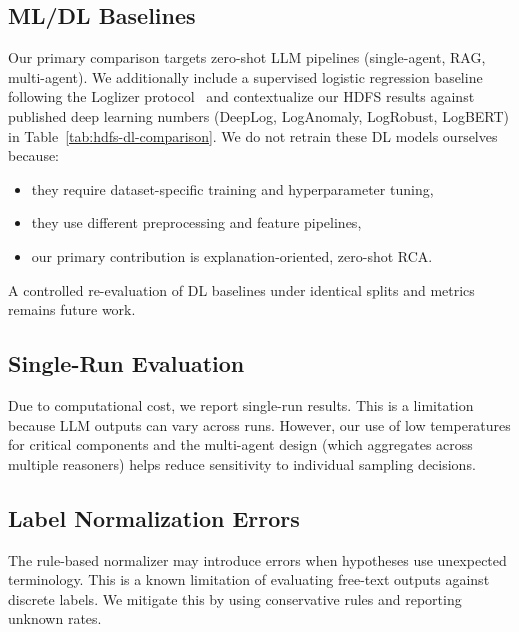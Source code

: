 \subsection{ML/DL Baselines}
Our primary comparison targets zero-shot LLM pipelines (single-agent, RAG, multi-agent).
We additionally include a supervised logistic regression baseline following
the Loglizer protocol~\cite{he2016loglizer} and contextualize our HDFS results against
published deep learning numbers (DeepLog, LogAnomaly, LogRobust, LogBERT) in
Table~\ref{tab:hdfs-dl-comparison}. We do not retrain these DL models ourselves because:
\begin{itemize}
  \item they require dataset-specific training and hyperparameter tuning,
  \item they use different preprocessing and feature pipelines,
  \item our primary contribution is explanation-oriented, zero-shot RCA.
\end{itemize}

A controlled re-evaluation of DL baselines under identical splits and metrics remains
future work.

\subsection{Single-Run Evaluation}
Due to computational cost, we report single-run results. This is a limitation because LLM outputs
can vary across runs. However, our use of low temperatures for critical components and the
multi-agent design (which aggregates across multiple reasoners) helps reduce sensitivity to
individual sampling decisions.

\subsection{Label Normalization Errors}
The rule-based normalizer may introduce errors when hypotheses use unexpected terminology. This is
a known limitation of evaluating free-text outputs against discrete labels. We mitigate this by
using conservative rules and reporting unknown rates.
